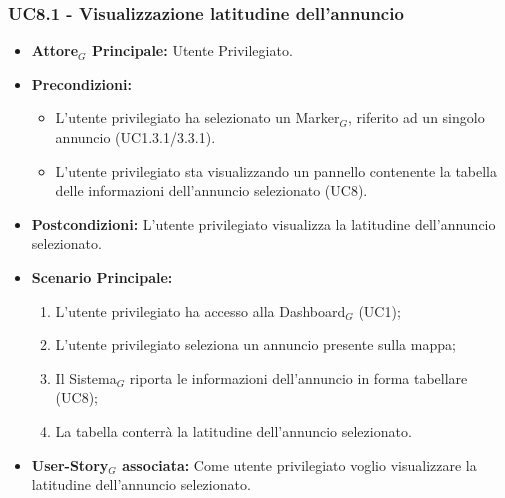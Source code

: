 \documentclass[10pt]{article}
\begin{document}
\begin{justify}
 \subsubsection{\textbf{UC8.1 - Visualizzazione latitudine dell'annuncio}}
 \begin{itemize}
     \item \textbf{Attore$_G$ Principale:} Utente Privilegiato.
     \item \textbf{Precondizioni:}
       \begin{itemize}
    	        \item L'utente privilegiato ha selezionato un Marker$_G$, riferito ad un singolo annuncio (UC1.3.1/3.3.1).
          \item L'utente privilegiato sta visualizzando un pannello contenente la tabella delle informazioni dell'annuncio selezionato (UC8).
       \end{itemize}
     \item \textbf{Postcondizioni:} L'utente privilegiato visualizza la latitudine dell'annuncio selezionato.
     \item \textbf{Scenario Principale:}
        \begin{enumerate}
            \item L'utente privilegiato ha accesso alla Dashboard$_G$ (UC1);
            \item L'utente privilegiato seleziona un annuncio presente sulla mappa;
            \item Il Sistema$_G$ riporta le informazioni dell'annuncio in forma tabellare (UC8);
            \item La tabella conterrà la latitudine dell'annuncio selezionato.
        \end{enumerate}
     \item \textbf{User-Story$_G$ associata:} Come utente privilegiato voglio visualizzare la latitudine dell'annuncio selezionato. 
 \end{itemize}

\end{justify}
\end{document}
